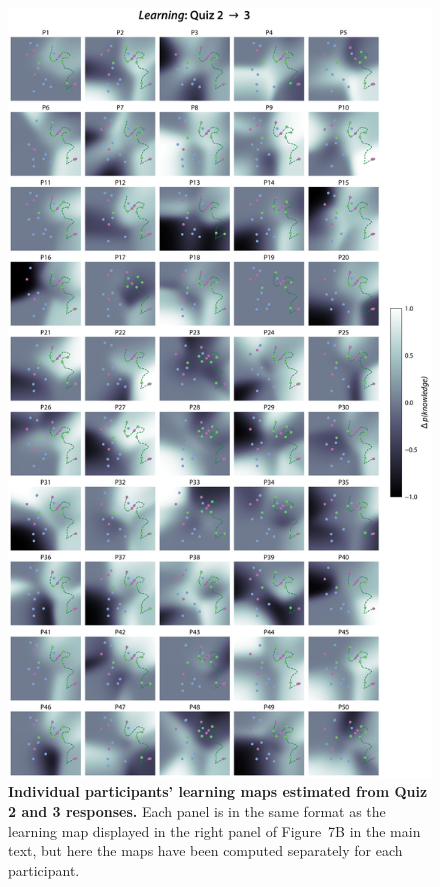 \documentclass[10pt]{article}
\newcommand{\knowledgeMaps}{7}
\begin{document}
\begin{figure}[tp]
    \centering
    \includegraphics[height=0.9\textheight]{figs/individual-learnings-maps-quiz2-3}
    
    \caption{\textbf{Individual participants' learning maps estimated from
    Quiz 2 and 3 responses.} Each panel is in the same format as the learning map
    displayed in the right panel of Figure~\knowledgeMaps B in the main text,
    but here the maps have been computed separately for each participant.}
    
    \label{fig:learning-maps-q2_3}
\end{figure}
\end{document}
